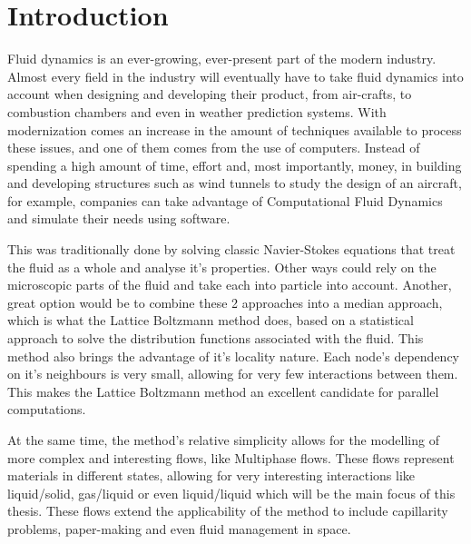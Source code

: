 \documentclass[12pt, openany]{book}
\begin{document}
%
%
\mainmatter

\chapter{Introduction}

Fluid dynamics is an ever-growing, ever-present part of the modern industry. Almost every field in the industry will eventually have to take fluid dynamics into account when designing and developing their product, from air-crafts, to combustion chambers and even in weather prediction systems. With modernization comes an increase in the amount of techniques available to process these issues, and one of them comes from the use of computers. Instead of spending a high amount of time, effort and, most importantly, money, in building and developing structures such as wind tunnels to study the design of an aircraft, for example, companies can take advantage of Computational Fluid Dynamics and simulate their needs using software. \par
This was traditionally done by solving classic Navier-Stokes equations that treat the fluid as a whole and analyse it's properties. Other ways could rely on the microscopic parts of the fluid and take each into particle into account. Another, great option would be to combine these 2 approaches into a median approach, which is what the Lattice Boltzmann method does, based on a statistical approach to solve the distribution functions associated with the fluid. This method also brings the advantage of it's locality nature. Each node's dependency on it's neighbours is very small, allowing for very few interactions between them. This makes the Lattice Boltzmann method an excellent candidate for parallel computations.\par
At the same time, the method's relative simplicity allows for the modelling of more complex and interesting flows, like Multiphase flows. These flows represent materials in different states, allowing for very interesting interactions like liquid/solid, gas/liquid or even liquid/liquid which will be the main focus of this thesis. These flows extend the applicability of the method to include capillarity problems, paper-making and even fluid management in space. \par
\end{document}
